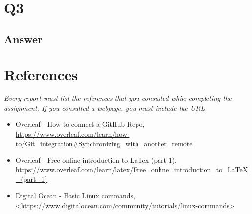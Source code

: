 \documentclass[12pt]{article}
\begin{document}
\section*{Q3}

\subsection*{Answer}

\section*{References}

\emph{Every report must list the references that you consulted while completing the assignment. If you consulted a webpage, you must include the URL.}

\begin{itemize}
    \item {Overleaf - How to connect a GitHub Repo, \url{https://www.overleaf.com/learn/how-to/Git_integration#Synchronizing_with_another_remote}}
    \item{Overleaf - Free online introduction to LaTex (part 1), \url{https://www.overleaf.com/learn/latex/Free_online_introduction_to_LaTeX_(part_1)}}
    \item {Digital Ocean - Basic Linux commands, \url{<https://www.digitalocean.com/community/tutorials/linux-commands>}}
\end{itemize}
\end{document}

